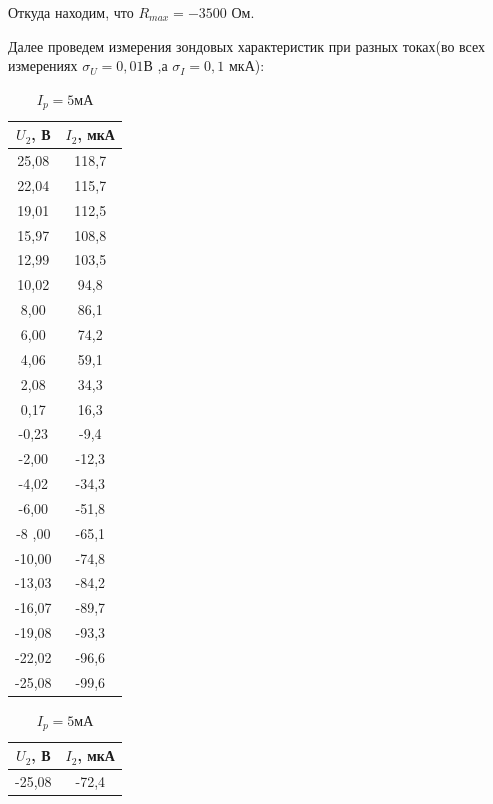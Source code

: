 \documentclass[a4paper]{article}
\begin{document}
Откуда находим, что $R_{max} = -3500$ Ом. 

Далее проведем измерения зондовых характеристик при разных токах(во всех измерениях $\sigma_U = 0,01$В ,а $\sigma_I = 0,1$ мкА):

  \begin{table}[!h]
  \begin{floatrow}
   \ttabbox[\FBwidth]{}%
           {
\begin{tabular}{|c|c|}
\hline
$U_2$, В &$ I_2$, мкА \\ \hline
25,08   & 118,7     \\ \hline
22,04   & 115,7     \\ \hline
19,01   & 112,5     \\ \hline
15,97   & 108,8     \\ \hline
12,99   & 103,5     \\ \hline
10,02   & 94,8      \\ \hline
8,00       & 86,1      \\ \hline
6,00      & 74,2      \\ \hline
4,06    & 59,1      \\ \hline
2,08    & 34,3      \\ \hline
0,17    & 16,3      \\ \hline
-0,23   & -9,4      \\ \hline
-2,00      & -12,3     \\ \hline
-4,02   & -34,3     \\ \hline
-6,00      & -51,8     \\ \hline
-8 ,00     & -65,1     \\ \hline
-10,00     & -74,8     \\ \hline
-13,03  & -84,2     \\ \hline
-16,07  & -89,7     \\ \hline
-19,08  & -93,3     \\ \hline
-22,02  & -96,6     \\ \hline
-25,08  & -99,6     \\ \hline
\end{tabular}
\caption{$I_p = 5$мА}
    }
   \ttabbox[\FBwidth]{}%
           {
\begin{tabular}{|c|c|}
\hline
$U_2$, В &$ I_2$, мкА \\ \hline
-25,08  & -72,4     \\ \hline

\end{tabular}}
\end{floatrow}
\end{table}
\end{document}
